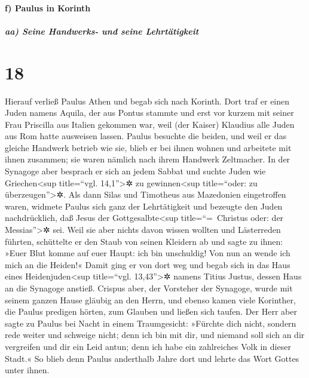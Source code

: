 \hypertarget{f-paulus-in-korinth}{%
\paragraph{f) Paulus in Korinth}\label{f-paulus-in-korinth}}

\hypertarget{aa-seine-handwerks--und-seine-lehrtuxe4tigkeit}{%
\subparagraph{aa) Seine Handwerks- und seine
Lehrtätigkeit}\label{aa-seine-handwerks--und-seine-lehrtuxe4tigkeit}}

\hypertarget{section-17}{%
\section{18}\label{section-17}}

 Hierauf verließ Paulus Athen und begab sich nach Korinth.
 Dort traf er einen Juden namens Aquila, der aus Pontus
stammte und erst vor kurzem mit seiner Frau Priscilla aus Italien
gekommen war, weil (der Kaiser) Klaudius alle Juden aus Rom hatte
ausweisen lassen. Paulus besuchte die beiden,  und weil er
das gleiche Handwerk betrieb wie sie, blieb er bei ihnen wohnen und
arbeitete mit ihnen zusammen; sie waren nämlich nach ihrem Handwerk
Zeltmacher.  In der Synagoge aber besprach er sich an
jedem Sabbat und suchte Juden wie Griechen\textless sup title=``vgl.
14,1''\textgreater✲ zu gewinnen\textless sup title=``oder: zu
überzeugen''\textgreater✲.  Als dann Silas und Timotheus
aus Mazedonien eingetroffen waren, widmete Paulus sich ganz der
Lehrtätigkeit und bezeugte den Juden nachdrücklich, daß Jesus der
Gottgesalbte\textless sup title=``=~Christus oder: der
Messias''\textgreater✲ sei.  Weil sie aber nichts davon
wissen wollten und Lästerreden führten, schüttelte er den Staub von
seinen Kleidern ab und sagte zu ihnen: »Euer Blut komme auf euer Haupt:
ich bin unschuldig! Von nun an wende ich mich an die Heiden!«
 Damit ging er von dort weg und begab sich in das Haus
eines Heidenjuden\textless sup title=``vgl. 13,43''\textgreater✲ namens
Titius Justus, dessen Haus an die Synagoge anstieß. 
Crispus aber, der Vorsteher der Synagoge, wurde mit seinem ganzen Hause
gläubig an den Herrn, und ebenso kamen viele Korinther, die Paulus
predigen hörten, zum Glauben und ließen sich taufen.  Der
Herr aber sagte zu Paulus bei Nacht in einem Traumgesicht: »Fürchte dich
nicht, sondern rede weiter und schweige nicht;  denn ich
bin mit dir, und niemand soll sich an dir vergreifen und dir ein Leid
antun; denn ich habe ein zahlreiches Volk in dieser Stadt.«
 So blieb denn Paulus anderthalb Jahre dort und lehrte
das Wort Gottes unter ihnen.

